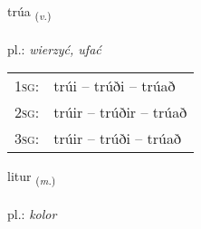 \documentclass[frontgrid, backgrid]{flacards}\usepackage[]{graphicx}\usepackage[]{xcolor}
\begin{document}
\renewcommand{\flhead}{\vskip5pt \fboxsep=0pt {\small\bfseries\footnotesize Nafnorð | Verb}}
\renewcommand{\fcfoot}{\vskip5pt \fboxsep=0pt \hspace{2pt}{\small\bfseries\footnotesize 1K}}

\renewcommand{\blhead}{\vskip5pt {\small\bfseries\footnotesize Nafnorð | Verb }}
\renewcommand{\bcfoot}{\vskip5pt \hspace{2pt}{\small\bfseries\footnotesize 1K}}


{trúa \small{\textsubscript{(\textit{v.})}} \\[1ex] %
\textphonetic{[tʰruːa]} \\
pl.: \emph{wierzyć, ufać} \\  [2ex]
\renewcommand*{\arraystretch}{0.8}
\begin{tabular}{p{1cm}l}
\textsc{1sg}: & trúi -- trúði -- trúað \\ 
\textsc{2sg}: & trúir -- trúðir -- trúað \\ 
\textsc{3sg}: & trúir -- trúði -- trúað \\ 
\end{tabular}
}

\renewcommand{\flhead}{\vskip5pt \fboxsep=0pt {\small\bfseries\footnotesize Nafnorð | Noun}}
\renewcommand{\fcfoot}{\vskip5pt \fboxsep=0pt \hspace{2pt}{\small\bfseries\footnotesize 1K}}

\renewcommand{\blhead}{\vskip5pt {\small\bfseries\footnotesize Nafnorð | Noun }}
\renewcommand{\bcfoot}{\vskip5pt \hspace{2pt}{\small\bfseries\footnotesize 1K}}


{litur \small{\textsubscript{(\textit{m.})}} \\[1ex] %
\textphonetic{[lɪːtʏr]} \\
pl.: \emph{kolor} \\  [2ex]
\renewcommand*{\arraystretch}{0.8}
}
\end{document}
